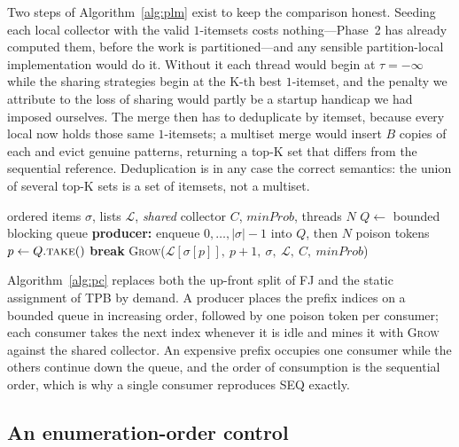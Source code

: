 \documentclass[pdflatex,sn-vancouver-num]{sn-jnl}
\theoremstyle{thmstyleone}%
\theoremstyle{thmstyletwo}%
\theoremstyle{thmstylethree}%
\newcommand{\minprob}{\mathit{minProb}}
\newcommand{\Kk}{\mathrm{K}}
\begin{document}
Two steps of Algorithm~\ref{alg:plm} exist to keep the comparison
honest. Seeding each local collector with the valid $1$-itemsets costs
nothing---Phase~2 has already computed them, before the work is
partitioned---and any sensible partition-local implementation would do
it. Without it each thread would begin at $\tau=-\infty$ while the
sharing strategies begin at the $\Kk$-th best $1$-itemset, and the
penalty we attribute to the loss of sharing would partly be a startup
handicap we had imposed ourselves. The merge then has to deduplicate by
itemset, because every local now holds those same $1$-itemsets; a
multiset merge would insert $B$ copies of each and evict genuine
patterns, returning a top-$\Kk$ set that differs from the sequential
reference. Deduplication is in any case the correct semantics: the union
of several top-$\Kk$ sets is a set of itemsets, not a multiset.

\begin{algorithm}[t]
\caption{\textsc{ProducerConsumerMine} (PC): dynamic queue scheduling}\label{alg:pc}
\begin{algorithmic}[1]
\Require ordered items $\sigma$, lists $\mathcal{L}$, \emph{shared} collector $C$, $\minprob$, threads $N$
\State $Q \gets$ bounded blocking queue
\State \textbf{producer:} enqueue $0,\dots,|\sigma|-1$ into $Q$, then $N$ poison tokens
  \Loop
     \State $p \gets Q.\textsc{take}()$
      \State \textbf{break} \EndIf
     \State \textsc{Grow}($\mathcal{L}[\sigma[p]],\ p{+}1,\ \sigma,\ \mathcal{L},\ C,\ \minprob$)
  \EndLoop
\EndFor
\end{algorithmic}
\end{algorithm}

Algorithm~\ref{alg:pc} replaces both the up-front split of FJ and the
static assignment of TPB by demand. A producer places the prefix indices
on a bounded queue in increasing order, followed by one poison token per
consumer; each consumer takes the next index whenever it is idle and mines
it with \textsc{Grow} against the shared collector. An expensive prefix
occupies one consumer while the others continue down the queue, and the
order of consumption is the sequential order, which is why a single
consumer reproduces SEQ exactly.

\subsection{An enumeration-order control}\label{subsec:seqrev}
 
\end{document}
